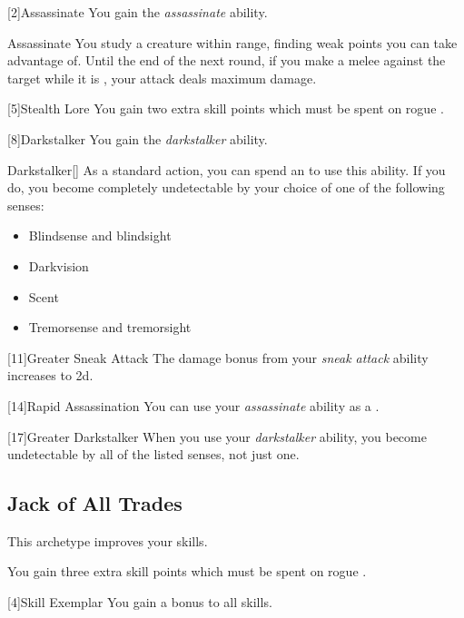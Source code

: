         [2]{Assassinate} You gain the \textit{assassinate} ability.
        \begin{ability}{Assassinate}
            You study a creature within \rnglong range, finding weak points you can take advantage of.
            Until the end of the next round, if you make a melee  against the target while it is \unaware, your attack deals maximum damage.
        \end{ability}

        [5]{Stealth Lore} You gain two extra skill points which must be spent on rogue .

        [8]{Darkstalker} You gain the \textit{darkstalker} ability.
        \begin{ability}{Darkstalker}[]
            As a standard action, you can spend an  to use this ability.
            If you do, you become completely undetectable by your choice of one of the following senses:
            \begin{itemize}
                \item Blindsense and blindsight
                \item Darkvision
                \item Scent
                \item Tremorsense and tremorsight
            \end{itemize}
        \end{ability}

        [11]{Greater Sneak Attack}
        The damage bonus from your \textit{sneak attack} ability increases to \plus2d.

        [14]{Rapid Assassination} You can use your \textit{assassinate} ability as a .

        [17]{Greater Darkstalker} When you use your \textit{darkstalker} ability, you become undetectable by all of the listed senses, not just one.

    \subsection{Jack of All Trades}
        This archetype improves your skills.

         You gain three extra skill points which must be spent on rogue .

        [4]{Skill Exemplar} You gain a  bonus to all skills.


